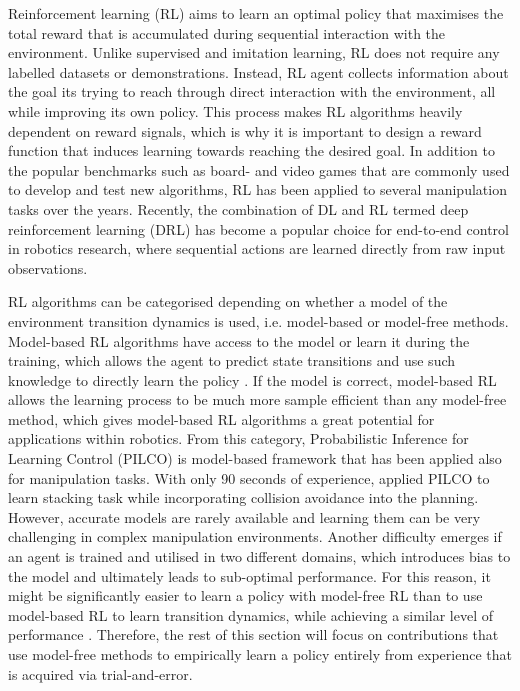 Reinforcement learning (RL) \cite{sutton_reinforcement_2018} aims to learn an optimal policy that maximises the total reward that is accumulated during sequential interaction with the environment. Unlike supervised and imitation learning, RL does not require any labelled datasets or demonstrations. Instead, RL agent collects information about the goal its trying to reach through direct interaction with the environment, all while improving its own policy. This process makes RL algorithms heavily dependent on reward signals, which is why it is important to design a reward function that induces learning towards reaching the desired goal. In addition to the popular benchmarks such as board- and video games that are commonly used to develop and test new algorithms, RL has been applied to several manipulation tasks over the years. Recently, the combination of DL and RL termed deep reinforcement learning (DRL) has become a popular choice for end-to-end control in robotics research, where sequential actions are learned directly from raw input observations.

RL algorithms can be categorised depending on whether a model of the environment transition dynamics is used, i.e. model-based or model-free methods. Model-based RL algorithms have access to the model or learn it during the training, which allows the agent to predict state transitions and use such knowledge to directly learn the policy \cite{polydoros_survey_2017}. If the model is correct, model-based RL allows the learning process to be much more sample efficient than any model-free method, which gives model-based RL algorithms a great potential for applications within robotics. From this category, Probabilistic Inference for Learning Control (PILCO) \cite{deisenroth_pilco_2011} is model-based framework that has been applied also for manipulation tasks. With only 90 seconds of experience, \citet{durrant-whyte_learning_2012} applied PILCO to learn stacking task while incorporating collision avoidance into the planning. However, accurate models are rarely available and learning them can be very challenging in complex manipulation environments. Another difficulty emerges if an agent is trained and utilised in two different domains, which introduces bias to the model and ultimately leads to sub-optimal performance. For this reason, it might be significantly easier to learn a policy with model-free RL than to use model-based RL to learn transition dynamics, while achieving a similar level of performance \cite{kroemer_review_2021}. Therefore, the rest of this section will focus on contributions that use model-free methods to empirically learn a policy entirely from experience that is acquired via trial-and-error.

